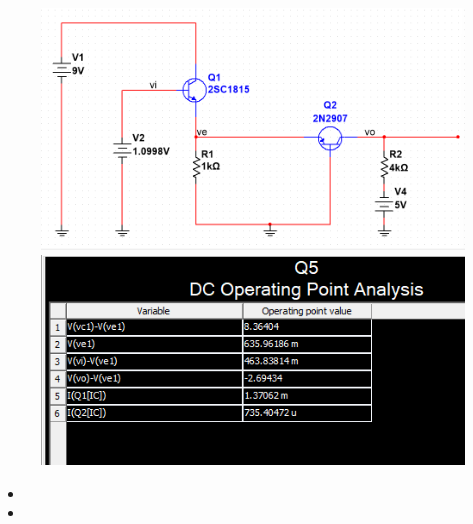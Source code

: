 \begin{figure}[H]
	\centering
	\begin{minipage}{.4\linewidth}
		\includegraphics[width=\linewidth]{./my-chapters/my-images/Question5/b_Q_tong_hinh.png}
	\end{minipage}
	\begin{minipage}{.5\linewidth}
		\includegraphics[width=\linewidth]{./my-chapters/my-images/Question5/b_Q_tong_bang.png}
	\end{minipage}
\end{figure}

\begin{itemize}[label=-, leftmargin=2cm]
	\item {}
	\item {}
\end{itemize}


